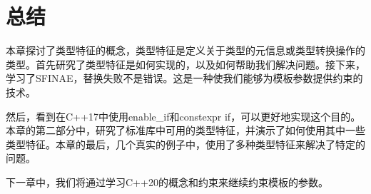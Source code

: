 \section{总结}
本章探讨了类型特征的概念，类型特征是定义关于类型的元信息或类型转换操作的类型。首先研究了类型特征是如何实现的，以及如何帮助我们解决问题。接下来，学习了SFINAE，替换失败不是错误。这是一种使我们能够为模板参数提供约束的技术。

然后，看到在C++17中使用enable_if和constexpr if，可以更好地实现这个目的。本章的第二部分中，研究了标准库中可用的类型特征，并演示了如何使用其中一些类型特征。本章的最后，几个真实的例子中，使用了多种类型特征来解决了特定的问题。

下一章中，我们将通过学习C++20的概念和约束来继续约束模板的参数。